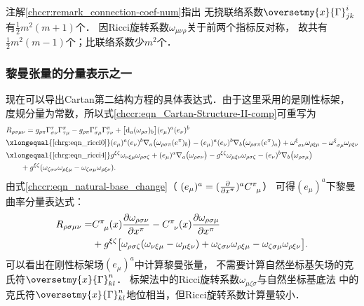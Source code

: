 \begin{remark}\label{chrg:remark_ricci-coef-num}
    注解\ref{chccr:remark_connection-coef-num}指出
    无挠联络系数$\oversetmy{x}{\Gamma}^{i}_{jk}$有$\frac{1}{2}m^2(m+1)$个．
    因Ricci旋转系数$\omega_{\mu\nu\rho}$关于前两个指标反对称，
    故共有$\frac{1}{2}m^2(m-1)$个；比联络系数少$m^2$个．
\end{remark}


\subsubsection{黎曼张量的分量表示之一}\label{chrg:sec_Riemann_rr}
现在可以导出Cartan第二结构方程的具体表达式．由于这里采用的是{\kaishu 刚性}标架，
度规分量为常数，所以式\eqref{chccr:eqn_Cartan-Structure-II-comp}可重写为
\begin{align*}
    &R_{\rho\sigma\mu\nu} = g_{\rho\pi} \Gamma _{\sigma \nu}^\tau \Gamma _{\tau\mu}^\pi
      - g_{\rho\pi}\Gamma _{\sigma \mu}^\tau \Gamma_{\tau\nu}^\pi +
      \bigl[{\rm d}_a (\omega_{\rho \sigma} )_b \bigr] (e_\mu)^a (e_\nu)^b     \\
     &\xlongequal{\ref{chrg:eqn_ricci0}} 
      (e_\mu)^a (e_\nu)^b \nabla_a\bigl(\omega_{\rho\sigma\pi} (e^\pi)_{b}\bigr) -
      (e_\mu)^a (e_\nu)^b \nabla_b \bigl(\omega_{\rho\sigma\pi} (e^\pi)_{a}  \bigr)
      + \omega _{\hphantom{\zeta}\sigma\nu}^{\xi} \omega _{\rho\xi\mu}
      - \omega _{\hphantom{\zeta}\sigma\mu}^{\xi} \omega _{\rho\xi\nu}  \\
     &\xlongequal{\ref{chrg:eqn_ricci4}} 
       g^{\xi\zeta}\omega_{\nu\xi\mu}\omega_{\rho\sigma\zeta}
      +(e_\mu)^a \nabla_a\bigl(\omega_{\rho\sigma\nu} \bigr)
      - g^{\xi\zeta}\omega_{\mu\xi\nu}\omega_{\rho\sigma\zeta}
      -(e_\nu)^b \nabla_b \bigl(\omega_{\rho\sigma\mu} \bigr)   \\
    &{\qquad} + g^{\xi\zeta} (\omega _{\zeta\sigma\nu} \omega _{\rho\xi\mu}
      - \omega _{\zeta\sigma\mu} \omega _{\rho\xi\nu}) .
\end{align*}  %
由式\eqref{chccr:eqn_natural-base_change}（
$({e}_\mu)^a = (\frac{\partial}{\partial x^\pi})^a C_{\hphantom{\pi} \mu}^{\pi}$）
可得$(e_\mu)^a$下黎曼曲率分量表达式：
\begin{equation}\label{chrg:eqn_Riemann_rr}
\begin{aligned}
   R_{\rho\sigma\mu\nu} =&
    C_{\hphantom{\pi} \mu}^{\pi}(x) \frac{\partial \omega_{\rho\sigma\nu}}{\partial x^\pi}
   -C_{\hphantom{\pi} \nu}^{\pi}(x) \frac{\partial \omega_{\rho\sigma\mu}}{\partial x^\pi} \\
   & + g^{\xi\zeta} \bigl[ \omega_{\rho\sigma\zeta} (\omega_{\nu\xi\mu}
   -\omega_{\mu\xi\nu}  ) + \omega _{\zeta\sigma\nu} \omega _{\rho\xi\mu}
   - \omega _{\zeta\sigma\mu} \omega _{\rho\xi\nu} \bigr] .
\end{aligned}
\end{equation}
可以看出在{\kaishu 刚性}标架场$(e_\mu)^{a}$中计算黎曼张量，
不需要计算自然坐标基矢场的克氏符$\oversetmy{x}{\Gamma}^n _{kl}$．
标架法中的Ricci旋转系数$\omega _{\mu\zeta\sigma}$与自然坐标基底法
中的克氏符$\oversetmy{x}{\Gamma}^n_{kl}$地位相当，但Ricci旋转系数计算量较小．


